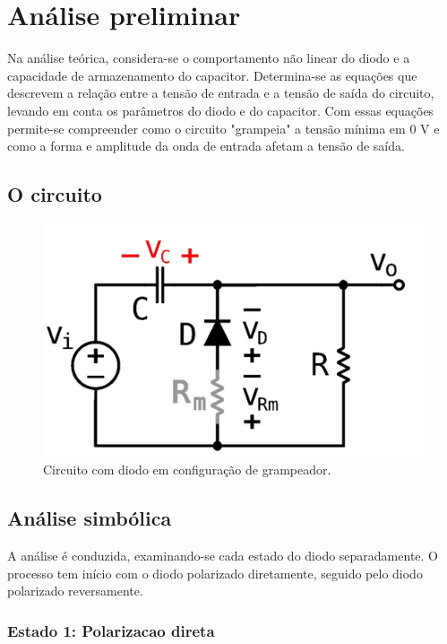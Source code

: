 \section{Análise preliminar}

Na análise teórica, considera-se o comportamento não linear do diodo e a capacidade de armazenamento do capacitor. Determina-se as equações que descrevem a relação entre a tensão de entrada e a tensão de saída do circuito, levando em conta os parâmetros do diodo e do capacitor. Com essas equações permite-se compreender como o circuito "grampeia" a tensão mínima em 0 V e como a forma e amplitude da onda de entrada afetam a tensão de saída.

\subsection{O circuito}

\begin{figure}[h]
    \centering
    \includegraphics[width=1\columnwidth]{images/o_circuito.png}
    \caption{Circuito com diodo em configuração de grampeador.}
\end{figure}

\newpage
\subsection{Análise simbólica}

A análise é conduzida, examinando-se cada estado do diodo separadamente. O processo tem início com o diodo polarizado diretamente, seguido pelo diodo polarizado reversamente.

\subsubsection{Estado 1: Polarizacao direta}

